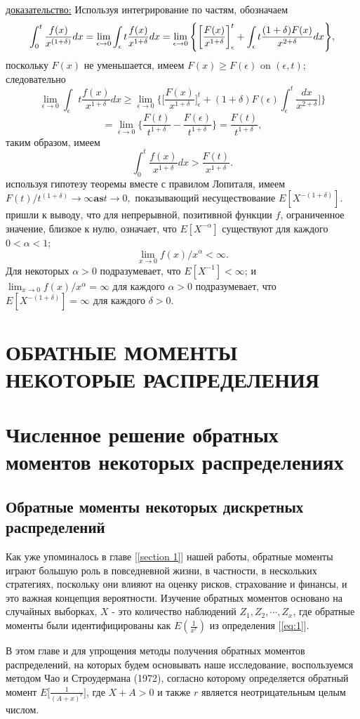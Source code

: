 \documentclass[13pt]{article}
\begin{document}
\underline{доказательство:}
Используя интегрирование по частям, обозначаем
\[
\int_{0}^{t}\frac{f(x)}{x^{(1+\delta)}}dx = \lim_{\epsilon \to 0}\int_{\epsilon}{t}\frac{f(x)}{x^{1+\delta}}dx \\
= \lim_{\epsilon \to 0}\Bigg\{\bigg[\frac{F(x)}{x^{1+\delta}}\bigg]_{\epsilon}^{t} + \int_{\epsilon}{t}\frac{(1+\delta)F(x)}{x^{2+\delta}}dx\Bigg\},
\]
поскольку $F(x)$ не уменьшается, имеем $F(x)\ge F(\epsilon)$ on $(\epsilon,t);$ следовательно
\[
    \lim_{\epsilon \to 0}\int_{\epsilon}{t}\frac{f(x)}{x^{1+\delta}}dx \ge \lim_{\epsilon \to 0}\Bigg\{\bigg[\frac{F(x)}{x^{1+\delta}}\bigg]_{\epsilon}^{t} + (1 + \delta)F(\epsilon)\int_{\epsilon}^{t}\frac{dx}{x^{2+\delta}}\bigg]\Bigg\}
\]
\[
 = \lim_{\epsilon \to 0}\Bigg\{ \frac{F(t)}{t^{1+\delta}} - \frac{F(\epsilon)}{t^{1+\delta}}\Bigg\} = \frac{F(t)}{t^{1+\delta}},
\]
таким образом, имеем
\[
\int_{0}^{t}\frac{f(x)}{x^{1+\delta}}dx > \frac{F(t)}{x^{1+\delta}}.
\]
используя гипотезу теоремы вместе с правилом Лопиталя, имеем $F(t)/t^(1+\delta) \to {\infty} \textbf{as} t \to 0,$ показывающий несуществование $E[X^{-(1+\delta)}]$. пришли к выводу, что для непрерывной, позитивной функции $f$, ограниченное значение, близкое к нулю, означает, что $E[X^{-\alpha}]$ существуют для каждого $0 < \alpha < 1$;
\[
\lim_{x \to 0}f(x)/x^{\alpha} < \infty.
\]
Для некоторых $\alpha > 0$ подразумевает, что $E[X^{-1}]<\infty$; и $\lim_{x \to 0}f(x)/x^{\alpha} = \infty $ для каждого $\alpha > 0$ подразумевает, что $E[X^{-(1 + \delta)}] =  \infty$ для каждого $\delta > 0$. 
\newpage
\section*{ОБРАТНЫЕ МОМЕНТЫ НЕКОТОРЫЕ РАСПРЕДЕЛЕНИЯ}
\section{Численное решение обратных моментов некоторых распределениях}\label{section 2}
\subsection{Обратные моменты некоторых дискретных распределений}
Как уже упоминалось в главе [\ref{section 1}] нашей работы, обратные моменты играют большую роль в повседневной жизни, в частности, в нескольких стратегиях, поскольку они влияют на оценку рисков, страхование и финансы, и это важная концепция вероятности. Изучение обратных моментов основано на случайных выборках, $X$ - это количество наблюдений $Z_{1}, Z_{2}, \cdots, Z_{x}$, где обратные моменты были идентифицированы как $E(\frac{1}{x^{r}})$ из определения [\ref{eq:1}].\par
В этом главе и для упрощения методы получения обратных моментов распределений, на которых будем основывать наше исследование, воспользуемся методом Чао и Строудермана (1972)\cite{chao1972negative}, согласно которому определяется обратный момент $E\bigg[\frac{1}{(A + x)^{r}}\bigg]$, где $X + A > 0$ и также $r$ является неотрицательным целым числом.
\end{document}
